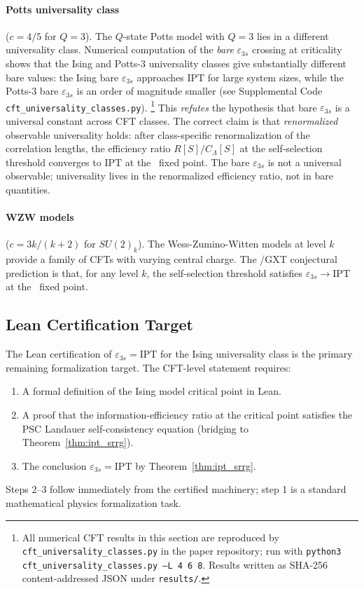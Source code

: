 \documentclass[11pt]{article}
\theoremstyle{remark}
\newcommand{\SRRG}{\text{SRRG}}
\newcommand{\IPT}{\mathrm{IPT}}
\begin{document}
\paragraph{Potts universality class} ($c = 4/5$ for $Q = 3$). The $Q$-state Potts
model with $Q = 3$ lies in a different universality class. Numerical computation of
the \emph{bare} $\varepsilon_{3s}$ crossing at criticality shows that the Ising and
Potts-3 universality classes give substantially different bare values:
the Ising bare $\varepsilon_{3s}$ approaches $\IPT$ for large system sizes, while
the Potts-3 bare $\varepsilon_{3s}$ is an order of magnitude smaller
(see Supplemental Code \texttt{cft\_universality\_classes.py}).%
\footnote{All numerical CFT results in this section are reproduced by
\texttt{cft\_universality\_classes.py} in the paper repository; run with
\texttt{python3 cft\_universality\_classes.py --L 4 6 8}.
Results written as SHA-256 content-addressed JSON under \texttt{results/}.}
This \emph{refutes} the hypothesis that bare $\varepsilon_{3s}$ is a universal constant
across CFT classes.
The correct claim is that \emph{renormalized} observable universality holds:
after class-specific renormalization of the correlation lengths,
the efficiency ratio $R[S]/C_\Lambda[S]$ at the self-selection threshold
converges to $\IPT$ at the \SRRG\ fixed point.
The bare $\varepsilon_{3s}$ is not a universal observable; universality lives in the
renormalized efficiency ratio, not in bare quantities.

\paragraph{WZW models} ($c = 3k/(k+2)$ for $SU(2)_k$). The Wess-Zumino-Witten
models at level $k$ provide a family of CFTs with varying central charge.
The \SRRG/GXT conjectural prediction is that, for any level $k$, the self-selection threshold satisfies
$\varepsilon_{3s} \to \IPT$ at the \SRRG\ fixed point.

\subsection{Lean Certification Target}
\label{sec:lean_cft}

The Lean certification of $\varepsilon_{3s} = \IPT$ for the Ising universality
class is the primary remaining formalization target. The CFT-level statement
requires:
\begin{enumerate}[leftmargin=2.5em]
\item A formal definition of the Ising model critical point in Lean.
\item A proof that the information-efficiency ratio at the critical point satisfies
  the PSC Landauer self-consistency equation (bridging to Theorem~\ref{thm:ipt_srrg}).
\item The conclusion $\varepsilon_{3s} = \IPT$ by Theorem~\ref{thm:ipt_srrg}.
\end{enumerate}
Steps 2--3 follow immediately from the certified machinery; step 1 is a
standard mathematical physics formalization task.
\end{document}
